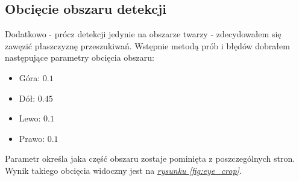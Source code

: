 \subsection{Obcięcie obszaru detekcji}
Dodatkowo - prócz detekcji jedynie na obszarze twarzy - zdecydowałem się zawęzić płaszczyznę przeszukiwań.
Wstępnie metodą prób i błędów dobrałem następujące parametry obcięcia obszaru:
\begin{itemize}
    \item Góra: $0.1$
    \item Dół: $0.45$
    \item Lewo: $0.1$
    \item Prawo: $0.1$
\end{itemize}

Parametr określa jaka część obszaru zostaje pominięta z poszczególnych stron. Wynik takiego obcięcia widoczny jest na \hyperref[{fig:eye_crop}]{\textit{rysunku \ref{fig:eye_crop}}}.

